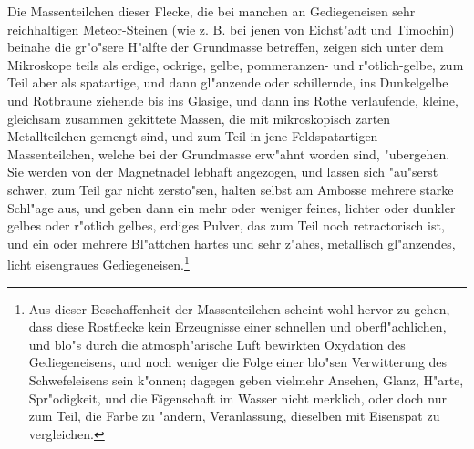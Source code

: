 \documentclass[a4paper, 11pt, oneside, german]{article}
\begin{document}
Die Massenteilchen dieser Flecke, die bei manchen an Gediegeneisen sehr reichhaltigen Meteor-Steinen (wie z. B. bei jenen von Eichst"adt und Timochin) beinahe die gr"o"sere H"alfte der Grundmasse betreffen, zeigen sich unter dem Mikroskope teils als erdige, ockrige, gelbe, pommeranzen- und r"otlich-gelbe, zum Teil aber als spatartige, und dann gl"anzende oder schillernde, ins Dunkelgelbe und Rotbraune ziehende bis ins Glasige, und dann ins Rothe verlaufende, kleine, gleichsam zusammen gekittete Massen, die mit mikroskopisch zarten Metallteilchen gemengt sind, und zum Teil in jene Feldspatartigen Massenteilchen, welche bei der Grundmasse erw"ahnt worden sind, "ubergehen. Sie werden von der Magnetnadel lebhaft angezogen, und lassen sich "au"serst schwer, zum Teil gar nicht zersto"sen, halten selbst am Ambosse mehrere starke Schl"age aus, und geben dann ein mehr oder weniger feines, lichter oder dunkler gelbes oder r"otlich gelbes, erdiges Pulver, das zum Teil noch retractorisch ist, und ein oder mehrere Bl"attchen hartes und sehr z"ahes, metallisch gl"anzendes, licht eisengraues Gediegeneisen.\footnote{Aus dieser Beschaffenheit der Massenteilchen scheint wohl hervor zu gehen, dass diese Rostflecke kein Erzeugnisse einer schnellen und oberfl"achlichen, und blo"s durch die atmosph"arische Luft bewirkten Oxydation des Gediegeneisens, und noch weniger die Folge einer blo"sen Verwitterung des Schwefeleisens sein k"onnen; dagegen geben vielmehr Ansehen, Glanz, H"arte, Spr"odigkeit, und die Eigenschaft im Wasser nicht merklich, oder doch nur zum Teil, die Farbe zu "andern, Veranlassung, dieselben mit Eisenspat zu vergleichen.}
\end{document}
